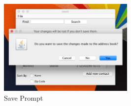 \documentclass[a4paper, 11pt]{article}
\begin{document}
\begin{enumerate}[label=\textbf{\arabic*})]
    \begin{figure}[h!]
    \centering
      \includegraphics[width=250]{close_save_error.png}
      \caption{Save Prompt}
    \end{figure} 
\end{enumerate}

\clearpage
\end{document}
